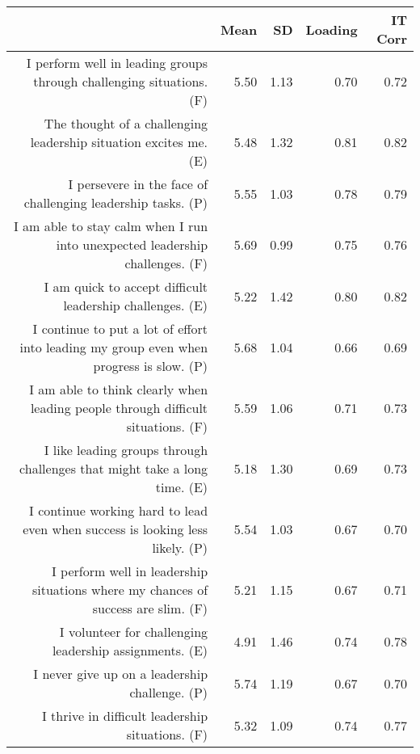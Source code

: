 \begin{table}[ht]
\centering
\begin{tabular}{rrrrr}
  \hline
 & Mean & SD & Loading & IT Corr \\ 
  \hline
I perform well in leading groups through challenging situations. (F) & 5.50 & 1.13 & 0.70 & 0.72 \\ 
  The thought of a challenging leadership situation excites me. (E) & 5.48 & 1.32 & 0.81 & 0.82 \\ 
  I persevere in the face of challenging leadership tasks. (P) & 5.55 & 1.03 & 0.78 & 0.79 \\ 
  I am able to stay calm when I run into unexpected leadership challenges. (F) & 5.69 & 0.99 & 0.75 & 0.76 \\ 
  I am quick to accept difficult leadership challenges. (E) & 5.22 & 1.42 & 0.80 & 0.82 \\ 
  I continue to put a lot of effort into leading my group even when progress is slow. (P) & 5.68 & 1.04 & 0.66 & 0.69 \\ 
  I am able to think clearly when leading people through difficult situations. (F) & 5.59 & 1.06 & 0.71 & 0.73 \\ 
  I like leading groups through challenges that might take a long time. (E) & 5.18 & 1.30 & 0.69 & 0.73 \\ 
  I continue working hard to lead even when success is looking less likely. (P) & 5.54 & 1.03 & 0.67 & 0.70 \\ 
  I perform well in leadership situations where my chances of success are slim. (F) & 5.21 & 1.15 & 0.67 & 0.71 \\ 
  I volunteer for challenging leadership assignments. (E) & 4.91 & 1.46 & 0.74 & 0.78 \\ 
  I never give up on a leadership challenge. (P) & 5.74 & 1.19 & 0.67 & 0.70 \\ 
  I thrive in difficult leadership situations. (F) & 5.32 & 1.09 & 0.74 & 0.77 \\ 
   \hline
\end{tabular}
\end{table}

